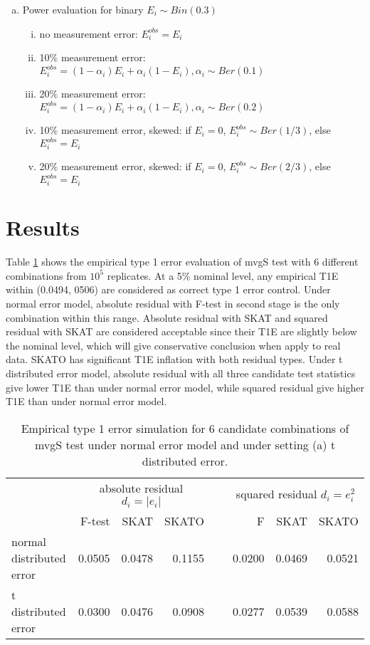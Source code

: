 \documentclass{article}
\begin{document}
\begin{enumerate}[(e)]
	\item Power evaluation for binary $E_i\sim Bin(0.3)$
	\begin{enumerate}[(i)]
		\item no measurement error: $E^{obs}_i=E_i$
		\item 10\% measurement error: $E^{obs}_i=(1-\alpha_i)E_i +\alpha_i(1-E_i), \alpha_i\sim Ber(0.1)$
		\item 20\% measurement error: $E^{obs}_i=(1-\alpha_i)E_i +\alpha_i(1-E_i), \alpha_i\sim Ber(0.2)$
		\item 10\% measurement error, skewed: if  $E_i=0$,  $E_i^{obs}\sim Ber(1/3)$, else $E_i^{obs}=E_i$
		\item 20\% measurement error, skewed: if  $E_i=0$,  $E_i^{obs}\sim Ber(2/3)$, else $E_i^{obs}=E_i$		
	\end{enumerate}
		
\end{enumerate}







\section{Results}

Table \ref{tab:t1e} shows the empirical type 1 error evaluation of mvgS test with 6 different combinations from $10^5$ replicates. At a 5\% nominal level, any empirical T1E within (0.0494, 0506) are considered as correct type 1 error control. Under normal error model, absolute residual with F-test in second stage is the only combination within this range. Absolute residual with SKAT and squared residual with SKAT are considered acceptable since their T1E are slightly below the nominal level, which will give conservative conclusion when apply to real data. SKATO has significant T1E inflation with both residual types. Under t distributed error model,  absolute residual with all three candidate test statistics give lower T1E than under normal error model, while squared residual give higher T1E than under normal error model. 

\begin{table}[ht]
\centering
\begin{tabular}{lrrrrrrr}
  \hline
 & \multicolumn{3}{c}{absolute residual $d_i=|e_i|$ }&\ & \multicolumn{3}{c}{squared residual $d_i=e_i^2$}\\
\cline{2-4}\cline{6-8}  		
& F-test & SKAT & SKATO && F & SKAT & SKATO \\ 
  \hline
 normal distributed error  & 0.0505 & 0.0478 & 0.1155 && 0.0200 & 0.0469 & 0.0521 \\ 
 t distributed error & 0.0300&  0.0476& 0.0908& & 0.0277& 0.0539 & 0.0588   \\

   \hline
\end{tabular}

\caption{Empirical type 1 error simulation for 6 candidate combinations of mvgS test under normal error model and under setting (a) t distributed error.}
\label{tab:t1e}
\end{table}
\end{document}

